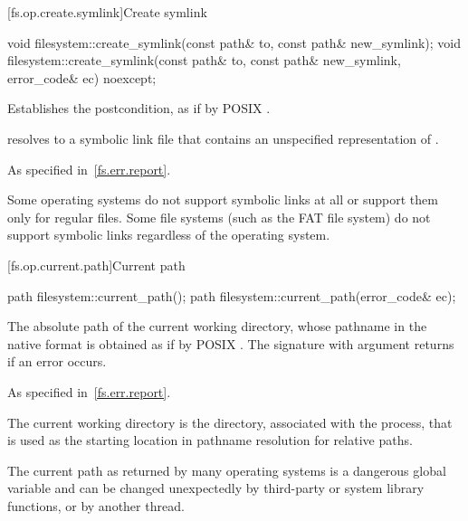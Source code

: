 [fs.op.create.symlink]{Create symlink}

%
\begin{itemdecl}
void filesystem::create_symlink(const path& to, const path& new_symlink);
void filesystem::create_symlink(const path& to, const path& new_symlink,
                    error_code& ec) noexcept;
\end{itemdecl}

\begin{itemdescr}
\pnum
\effects
Establishes the postcondition, as if by POSIX .

\pnum
\ensures
{} resolves to a symbolic link file that
  contains an unspecified representation of .

\pnum
\throws
As specified in~\ref{fs.err.report}.

\pnum
\begin{note}
Some operating systems do not support symbolic links at all or support
  them only for regular files.
  Some file systems (such as the FAT file system) do not
  support symbolic links regardless of the operating system.
\end{note}
\end{itemdescr}

[fs.op.current.path]{Current path}

%
\begin{itemdecl}
path filesystem::current_path();
path filesystem::current_path(error_code& ec);
\end{itemdecl}

\begin{itemdescr}
\pnum
\returns
The absolute path of the current working directory,
  whose pathname in the native format is
  obtained as if by POSIX .
  The signature with argument  returns  if an
  error occurs.

\pnum
\throws
As specified in~\ref{fs.err.report}.

\pnum
\remarks
The current working directory is the directory, associated
  with the process, that is used as the starting location in pathname resolution
  for relative paths.

\pnum
\begin{note}
The current path as returned by many operating systems is a dangerous
  global variable and can be changed unexpectedly by third-party or system
  library functions, or by another thread.
\end{note}
\end{itemdescr}


